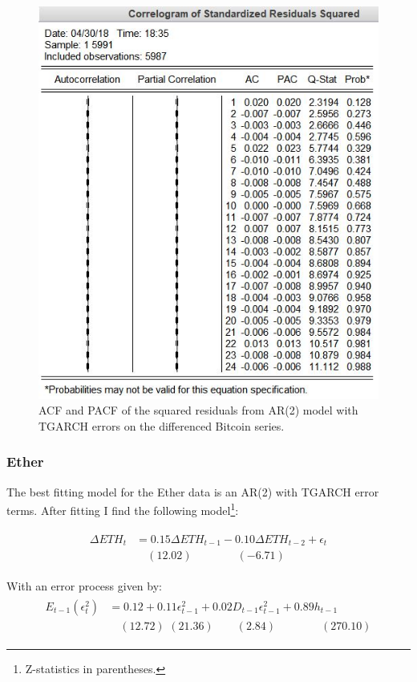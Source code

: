 \documentclass{article}
\begin{document}
	\begin{figure}[H]
		\centering
		\includegraphics[width = .75\textwidth]{btcTGARCH_residSqCor.jpg}
		\caption{ACF and PACF of the squared residuals from AR(2) model with TGARCH errors on the differenced Bitcoin series.}
	\end{figure}

	\subsubsection{Ether}
	
	The best fitting model for the Ether data is an AR(2) with TGARCH error terms. After fitting I find the following model\footnote{Z-statistics in parentheses.}: 
	
	\begin{align}
	\begin{split}
	\Delta ETH_t &= 0.15 \Delta ETH_{t-1} - 0.10 \Delta ETH_{t-2} + \epsilon_t\\
	& \quad (12.02) \quad \quad \quad \quad (-6.71) 
	\end{split}
	\end{align}
	
	With an error process given by: 
	\begin{align}
	\begin{split}
	E_{t-1}(\epsilon_t^2)  &= 0.12 + 0.11 \epsilon^2_{t-1} + 0.02 D_{t-1} \epsilon^2_{t-1} + 0.89 h_{t-1}\\
	& \quad (12.72) \,\, (21.36) \quad \quad (2.84) \quad \quad \quad \quad (270.10)
	\end{split}
	\end{align}
	
\end{document}
